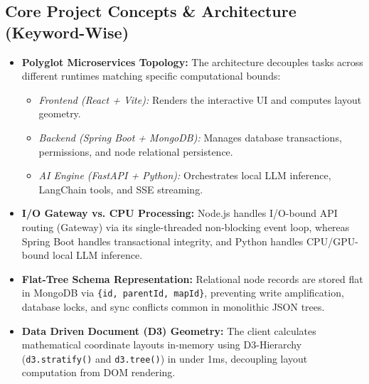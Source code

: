 \documentclass[12pt, a4paper]{article}
\begin{document}
\subsection{Core Project Concepts \& Architecture (Keyword-Wise)}
\begin{itemize}[leftmargin=*]
  \item \textbf{Polyglot Microservices Topology:} The architecture decouples tasks across different runtimes matching specific computational bounds:
    \begin{itemize}
      \item \textit{Frontend (React + Vite):} Renders the interactive UI and computes layout geometry.
      \item \textit{Backend (Spring Boot + MongoDB):} Manages database transactions, permissions, and node relational persistence.
      \item \textit{AI Engine (FastAPI + Python):} Orchestrates local LLM inference, LangChain tools, and SSE streaming.
    \end{itemize}
  \item \textbf{I/O Gateway vs. CPU Processing:} Node.js handles I/O-bound API routing (Gateway) via its single-threaded non-blocking event loop, whereas Spring Boot handles transactional integrity, and Python handles CPU/GPU-bound local LLM inference.
  \item \textbf{Flat-Tree Schema Representation:} Relational node records are stored flat in MongoDB via \texttt{\{id, parentId, mapId\}}, preventing write amplification, database locks, and sync conflicts common in monolithic JSON trees.
  \item \textbf{Data Driven Document (D3) Geometry:} The client calculates mathematical coordinate layouts in-memory using D3-Hierarchy (\texttt{d3.stratify()} and \texttt{d3.tree()}) in under 1ms, decoupling layout computation from DOM rendering.
\end{itemize}
\end{document}
